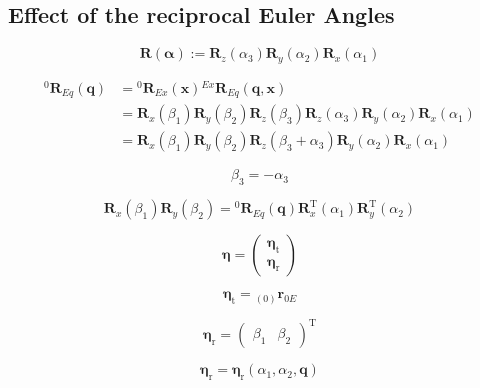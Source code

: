 \documentclass[twocolumn,10pt]{IFTOMM}
\newcommand{\bm}[1]{\boldsymbol{#1}}
\newcommand{\ortvek}[4]{{ }_{(#1)}{\boldsymbol{#2}}^{#3}_{#4} }
\newcommand{\rotmat}[2]{{{ }^{#1}\boldsymbol{R}}_{#2}}
\newcommand{\transp}[0]{{\mathrm{T}}}
\begin{document}
\subsection{Effect of the reciprocal Euler Angles}


\begin{equation}
\bm{R}(\bm{\alpha}) := \bm{R}_z(\alpha_3) \bm{R}_y(\alpha_2) \bm{R}_x(\alpha_1)
\end{equation}

\begin{align}
\rotmat{0}{Eq}(\bm{q})
&= \rotmat{0}{Ex}(\bm{x}) \rotmat{Ex}{Eq}(\bm{q},\bm{x}) \nonumber \\
&= \bm{R}_x(\beta_1) \bm{R}_y(\beta_2) \bm{R}_z(\beta_3) \bm{R}_z(\alpha_3) \bm{R}_y(\alpha_2)\bm{R}_x(\alpha_1) \nonumber \\
&= \bm{R}_x(\beta_1) \bm{R}_y(\beta_2) \bm{R}_z(\beta_3 + \alpha_3) \bm{R}_y(\alpha_2)\bm{R}_x(\alpha_1) \nonumber 
\end{align} 

\begin{equation}
\beta_3 = - \alpha_3
\end{equation}  

\begin{equation}
\bm{R}_x(\beta_1) \bm{R}_y(\beta_2) = \rotmat{0}{Eq}(\bm{q})
\bm{R}_x^\transp(\alpha_1)\bm{R}_y^\transp(\alpha_2) 
\end{equation} 


\begin{equation}
\bm{\eta}
=
\begin{pmatrix}
\bm{\eta}_{\mathrm{t}} \\
\bm{\eta}_{\mathrm{r}}
\end{pmatrix}
\end{equation}  

\begin{equation}
\bm{\eta}_{\mathrm{t}}
=
\ortvek{0}{r}{}{0E}
\end{equation}  

\begin{equation}
\bm{\eta}_{\mathrm{r}}
=
\begin{pmatrix}
\beta_1  & \beta_2
\end{pmatrix}^\transp
\end{equation}


\begin{equation}
\bm{\eta}_{\mathrm{r}}
=
\bm{\eta}_{\mathrm{r}}
(\alpha_1, \alpha_2, \bm{q})
\end{equation}
\end{document}
